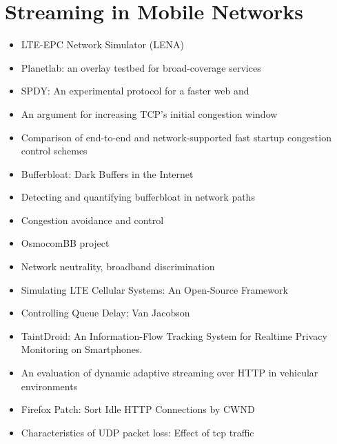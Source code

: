 \chapter{Streaming in Mobile Networks}
\label{chap:mobilestreaming}



\begin{itemize}
	\item LTE-EPC Network Simulator (LENA) \cite{ns3lte}
	\item Planetlab: an overlay testbed for broad-coverage services \cite{chun2003planetlab}
	\item SPDY: An experimental protocol for a faster web \cite{google2011SPDYdef} and \cite{google2010SPDYwp}
	\item An argument for increasing TCP's initial congestion window \cite{dukkipati2010argument}
	\item Comparison of end-to-end and network-supported fast startup congestion control schemes \cite{scharf2011comparison}
	\item Bufferbloat: Dark Buffers in the Internet \cite{gettys2011bufferbloat}
	\item Detecting and quantifying bufferbloat in network paths \cite{groenewegen2011detecting}
	\item Congestion avoidance and control \cite{jacobson1988congestion}
	\item OsmocomBB project \cite{osmocombbwww}
	\item Network neutrality, broadband discrimination \cite{wu2003network}
	\item Simulating LTE Cellular Systems: An Open-Source Framework \cite{5634134}
	\item Controlling Queue Delay; Van Jacobson \cite{Nichols:2012:CQD:2209249.2209264}
	\item TaintDroid: An Information-Flow Tracking System for Realtime Privacy Monitoring on Smartphones. \cite{enck2010taintdroid}
	\item An evaluation of dynamic adaptive streaming over HTTP in vehicular environments \cite{Muller:2012:EDA:2151677.2151686}
	\item Firefox Patch: Sort Idle HTTP Connections by CWND \cite{ffSortCWND}
	\item Characteristics of UDP packet loss: Effect of tcp traffic \cite{sawashima97characteristics}
\end{itemize}


